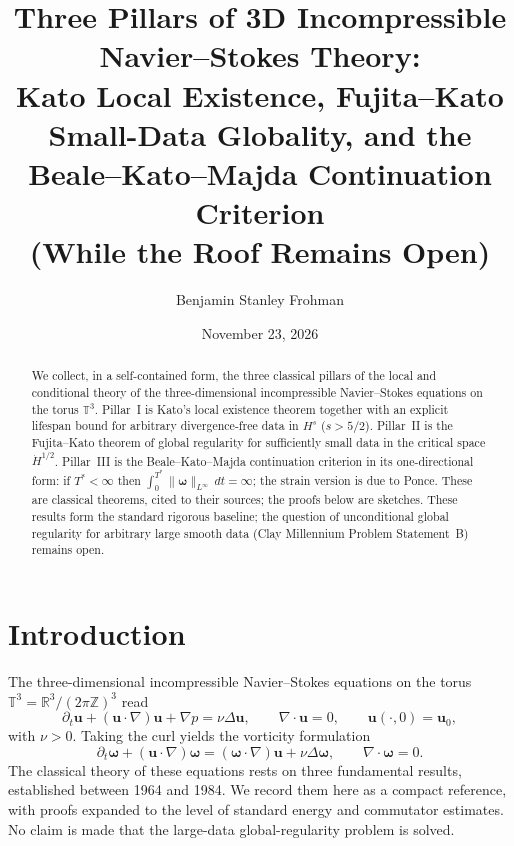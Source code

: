 \documentclass[11pt,a4paper]{article}
\title{Three Pillars of 3D Incompressible Navier--Stokes Theory:\\Kato Local Existence, Fujita--Kato Small-Data Globality, and the Beale--Kato--Majda Continuation Criterion\\(While the Roof Remains Open)}
\author{Benjamin Stanley Frohman}
\date{November 23, 2026}
\begin{document}
\maketitle
{}

\begin{abstract}
We collect, in a self-contained form, the three classical pillars of the local and conditional theory of the three-dimensional incompressible Navier--Stokes equations on the torus \(\mathbb{T}^3\). Pillar~I is Kato's local existence theorem together with an explicit lifespan bound for arbitrary divergence-free data in \(H^s\) (\(s>5/2\)). Pillar~II is the Fujita--Kato theorem of global regularity for sufficiently small data in the critical space \(\dot{H}^{1/2}\). Pillar~III is the Beale--Kato--Majda continuation criterion in its one-directional form: if \(T^*<\infty\) then \(\int_0^{T^*}\|\boldsymbol{\omega}\|_{L^\infty}\,dt=\infty\); the strain version is due to Ponce. These are classical theorems, cited to their sources; the proofs below are sketches. These results form the standard rigorous baseline; the question of unconditional global regularity for arbitrary large smooth data (Clay Millennium Problem Statement~B) remains open.
\end{abstract}

\section{Introduction}
The three-dimensional incompressible Navier--Stokes equations on the torus \(\mathbb{T}^3=\mathbb{R}^3/(2\pi\mathbb{Z})^3\) read
\begin{equation}\label{eq:NS}
\partial_t\mathbf{u}+(\mathbf{u}\cdot\nabla)\mathbf{u}+\nabla p=\nu\Delta\mathbf{u},\qquad\nabla\cdot\mathbf{u}=0,\qquad\mathbf{u}(\cdot,0)=\mathbf{u}_0,
\end{equation}
with \(\nu>0\). Taking the curl yields the vorticity formulation
\begin{equation}\label{eq:vorticity}
\partial_t\boldsymbol{\omega}+(\mathbf{u}\cdot\nabla)\boldsymbol{\omega}=(\boldsymbol{\omega}\cdot\nabla)\mathbf{u}+\nu\Delta\boldsymbol{\omega},\qquad\nabla\cdot\boldsymbol{\omega}=0.
\end{equation}
The classical theory of these equations rests on three fundamental results, established between 1964 and 1984. We record them here as a compact reference, with proofs expanded to the level of standard energy and commutator estimates. No claim is made that the large-data global-regularity problem is solved.
\end{document}
